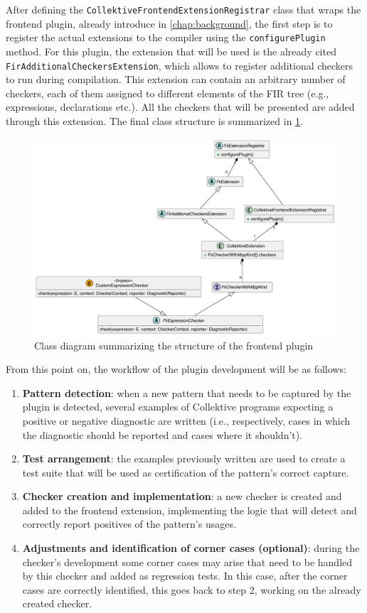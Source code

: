 \documentclass[12pt,a4paper,openright,twoside]{book}
\begin{document}
After defining the \lstinline{CollektiveFrontendExtensionRegistrar} class that
wraps the frontend plugin, already introduce in \cref{chap:background}, the
first step is to register the actual extensions to the compiler using the
\lstinline{configurePlugin} method. For this plugin, the extension that will
be used is the already cited \lstinline{FirAdditionalCheckersExtension}, which
allows to register additional checkers to run during compilation.
%
This extension can contain an arbitrary number of checkers, each of them
assigned to different elements of the \ac{FIR} tree (e.g., expressions,
declarations etc.). All the checkers that will be presented are added 
through this extension. The final class structure is summarized in
\cref{fig:frontend-class-diagram}.

\begin{figure}
  \centering
  \includegraphics[width=.8\linewidth]{figures/frontend-class-diagram.pdf}
  \caption{Class diagram summarizing the structure of the frontend plugin}
  \label{fig:frontend-class-diagram}
\end{figure}

From this point on, the workflow of the plugin development will be as follows:

\begin{enumerate}
  \item \textbf{Pattern detection}: when a new pattern that needs to be captured
  by the plugin is detected, several examples of Collektive programs expecting a
  positive or negative  diagnostic are written (i.e., respectively, cases in
  which the diagnostic should be reported and cases where it shouldn't).
  \item \textbf{Test arrangement}: the examples previously written are used to 
  create a test suite that will be used as certification of the pattern's correct
  capture. 
  \item \textbf{Checker creation and implementation}: a new checker is created and
  added to the frontend extension, implementing the logic that will detect and 
  correctly report positives of the pattern's usages.
  \item \textbf{Adjustments and identification of corner cases (optional)}: during
  the checker's development some corner cases may arise that need to be handled 
  by this checker and added as regression tests. In this case, after the corner 
  cases are correctly identified, this goes back to step 2, working on the already
  created checker.
\end{enumerate}
\end{document}
